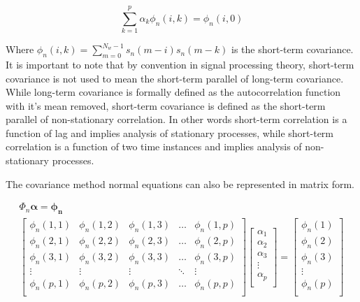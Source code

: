  \begin{equation}
 	\sum_{k=1}^{p} \alpha_k \phi_n(i,k) = \phi_n(i,0)
 \end{equation}
 
 \noindent
 Where $\phi_n(i,k) = \sum_{m=0}^{N_w-1} s_n(m-i) s_n(m-k)$ is the short-term covariance. It is important to note that by convention in signal processing theory, short-term covariance is not used to mean the short-term parallel of long-term covariance. While long-term covariance is formally defined as the autocorrelation function with it's mean removed, short-term covariance is defined as the short-term parallel of non-stationary correlation. In other words short-term correlation is a function of lag and implies analysis of stationary processes, while short-term correlation is a function of two time instances and implies analysis of non-stationary processes.
 
 The covariance method normal equations can also be represented in matrix form.
 
 \begin{eqnarray}
 	\Phi_n \boldsymbol{\alpha} = \boldsymbol{\phi_n} \\
 	\begin{bmatrix} 
 		\phi_n(1,1)   & \phi_n(1,2)   & \phi_n(1,3)     & \dots    & \phi_n(1,p)  \\
 		\phi_n(2,1)   & \phi_n(2,2)  & \phi_n(2,3)     & \dots     & \phi_n(2,p)  \\
 		\phi_n(3,1)   & \phi_n(3,2)  & \phi_n(3,3)     & \dots    & \phi_n(3,p)  \\
 		\vdots      & \vdots      & \vdots          & \ddots  & \vdots  \\
 		\phi_n(p,1)  & \phi_n(p,2)  & \phi_n(p,3)      & \dots    & \phi_n(p,p)  \\
 	\end{bmatrix} 
 	\begin{bmatrix}
 		\alpha_1 \\
 		\alpha_2 \\
 		\alpha_3 \\
 		\vdots    \\
 		\alpha_p \\
 	\end{bmatrix}
 	=
 	\begin{bmatrix}
 		\phi_n(1)  \\
 		\phi_n(2) \\
 		\phi_n(3) \\
 		\vdots    \\
 		\phi_n(p) \\
 	\end{bmatrix}
 \end{eqnarray}
 
